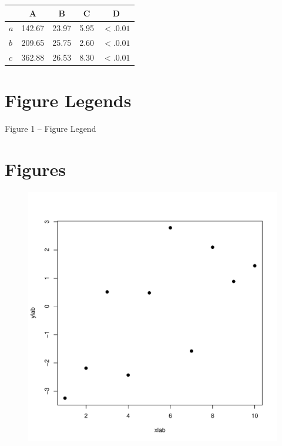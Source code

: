 \documentclass[12pt,english,titlepage]{article}
\begin{document}
\begin{spacing}{1.9}
\begin{flushleft}
\begin{tabular}{l|c|c|c|c}
              & A & B &C & D \\    
\hline
$a$ &142.67& 23.97 &  5.95 & $<.0.01$ \\
$b$   &  209.65 & 25.75  & 2.60  & $<.0.01$  \\
$c$   &362.88  & 26.53  & 8.30 & $<.0.01$ \\

\end{tabular}
\vskip 1cm
\newpage

\section{Figure Legends}

Figure 1 -- Figure Legend\\
\vspace{5mm}

\newpage

\section{Figures}

\begin{figure}[!h]
\includegraphics[width=\textwidth]{graph.pdf}
\caption{}
\end{figure}
\newpage


\end{flushleft}
\end{spacing}
\end{document}
